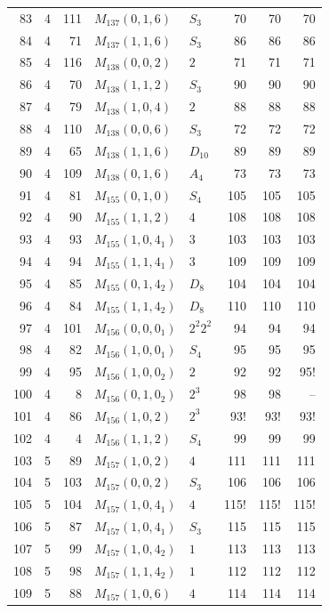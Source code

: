 \documentclass[11pt,a4paper]{article}
\begin{document}
\begin{longtable}{rrr|l|l|rrr}
83 & 4 & 111 & $M_{137}(0,1,6)$ & $S_3$ & 70 & 70 & 70\\
84 & 4 & 71 & $M_{137}(1,1,6)$ & $S_3$ & 86 & 86 & 86\\
85 & 4 & 116 & $M_{138}(0,0,2)$ & $2$ & 71 & 71 & 71\\
86 & 4 & 70 & $M_{138}(1,1,2)$ & $S_3$ & 90 & 90 & 90\\
87 & 4 & 79 & $M_{138}(1,0,4)$ & $2$ & 88 & 88 & 88\\
88 & 4 & 110 & $M_{138}(0,0,6)$ & $S_3$ & 72 & 72 & 72\\
89 & 4 & 65 & $M_{138}(1,1,6)$ & $D_{10}$ & 89 & 89 & 89\\
90 & 4 & 109 & $M_{138}(0,1,6)$ & $A_4$ & 73 & 73 & 73\\
91 & 4 & 81 & $M_{155}(0,1,0)$ & $S_4$ & 105 & 105 & 105\\
92 & 4 & 90 & $M_{155}(1,1,2)$ & $4$ & 108 & 108 & 108\\
93 & 4 & 93 & $M_{155}(1,0,4_1)$ & $3$ & 103 & 103 & 103\\
94 & 4 & 94 & $M_{155}(1,1,4_1)$ & $3$ & 109 & 109 & 109\\
95 & 4 & 85 & $M_{155}(0,1,4_2)$ & $D_8$ & 104 & 104 & 104\\
96 & 4 & 84 & $M_{155}(1,1,4_2)$ & $D_8$ & 110 & 110 & 110\\
97 & 4 & 101 & $M_{156}(0,0,0_1)$ & $2^2 2^2$ & 94 & 94 & 94\\
98 & 4 & 82 & $M_{156}(1,0,0_1)$ & $S_4$ & 95 & 95 & 95\\
99 & 4 & 95 & $M_{156}(1,0,0_2)$ & $2$ & 92 & 92 & 95!\\
100 & 4 & 8 & $M_{156}(0,1,0_2)$ & $2^3$ & 98 & 98 & --\\
101 & 4 & 86 & $M_{156}(1,0,2)$ & $2^3$ & 93! & 93! & 93!\\
102 & 4 & 4 & $M_{156}(1,1,2)$ & $S_4$ & 99 & 99 & 99\\
103 & 5 & 89 & $M_{157}(1,0,2)$ & $4$ & 111 & 111 & 111\\
104 & 5 & 103 & $M_{157}(0,0,2)$ & $S_3$ & 106 & 106 & 106\\
105 & 5 & 104 & $M_{157}(1,0,4_1)$ & $4$ & 115! & 115! & 115!\\
106 & 5 & 87 & $M_{157}(1,0,4_1)$ & $S_3$ & 115 & 115 & 115\\
107 & 5 & 99 & $M_{157}(1,0,4_2)$ & $1$ & 113 & 113 & 113\\
108 & 5 & 98 & $M_{157}(1,1,4_2)$ & $1$ & 112 & 112 & 112\\
109 & 5 & 88 & $M_{157}(1,0,6)$ & $4$ & 114 & 114 & 114\\

\end{longtable}
\end{document}
